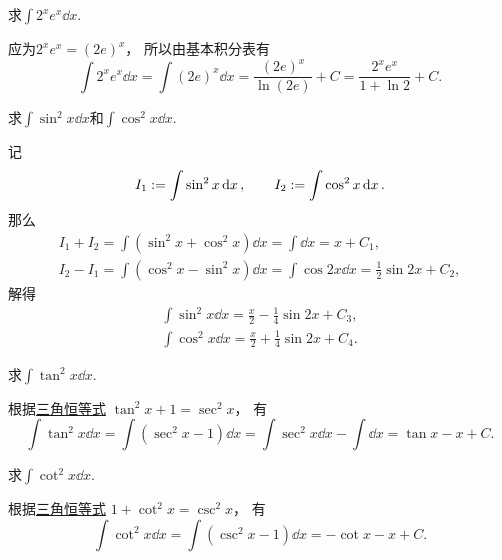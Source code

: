 \begin{example}
求\(\int 2^x e^x \dd{x}\).
\begin{solution}
应为\(2^x e^x = (2e)^x\)，
所以由基本积分表有\begin{equation*}
	\int 2^x e^x \dd{x}
	= \int (2e)^x \dd{x}
	= \frac{(2e)^x}{\ln(2e)} + C
	= \frac{2^x e^x}{1+\ln2} + C.
\end{equation*}
\end{solution}
\end{example}
\begin{example}
求\(\int \sin^2 x \dd{x}\)和\(\int \cos^2 x \dd{x}\).
\begin{solution}
记\begin{equation*}
	I_1 := \int \sin^2 x \dd{x},
	\qquad
	I_2 := \int \cos^2 x \dd{x}.
\end{equation*}
那么\begin{gather*}
	I_1 + I_2
	= \int (\sin^2 x + \cos^2 x) \dd{x}
	= \int \dd{x}
	= x + C_1, \\
	I_2 - I_1
	= \int (\cos^2 x - \sin^2 x) \dd{x}
	= \int \cos 2x \dd{x}
	= \frac12 \sin 2x + C_2,
\end{gather*}
解得\begin{gather*}
	\int \sin^2 x \dd{x} = \frac{x}2 - \frac14 \sin 2x + C_3, \\
	\int \cos^2 x \dd{x} = \frac{x}2 + \frac14 \sin 2x + C_4.
\end{gather*}
\end{solution}
\end{example}
\begin{example}
求\(\int \tan^2 x \dd{x}\).
\begin{solution}
根据\hyperref[equation:三角函数.毕达哥拉斯三角恒等式2]{三角恒等式}
\(\tan^2 x + 1 = \sec^2 x\)，
有\begin{equation*}
	\int \tan^2 x \dd{x}
	= \int (\sec^2 x - 1) \dd{x}
	= \int \sec^2 x \dd{x} - \int \dd{x}
	= \tan x - x + C.
\end{equation*}
\end{solution}
\end{example}
\begin{example}
求\(\int \cot^2 x \dd{x}\).
\begin{solution}
根据\hyperref[equation:三角函数.毕达哥拉斯三角恒等式3]{三角恒等式}
\(1 + \cot^2 x = \csc^2 x\)，
有\begin{equation*}
	\int \cot^2 x \dd{x}
	= \int (\csc^2 x - 1) \dd{x}
	= -\cot x - x + C.
\end{equation*}
\end{solution}
\end{example}
